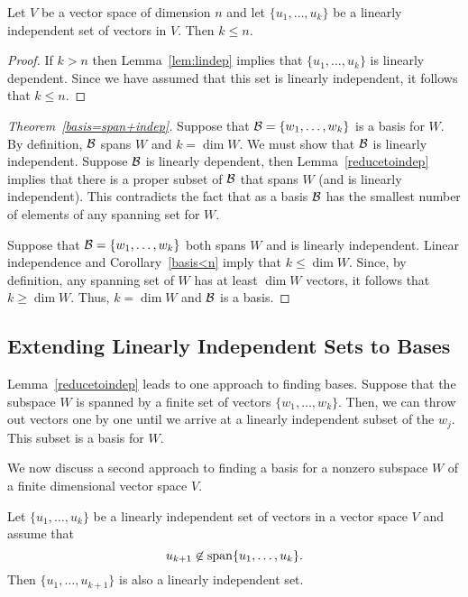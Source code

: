 \documentclass{ximera}
\begin{document}
\begin{corollary}  \label{basis<n}
Let $V$ be a vector space of dimension $n$ and let $\{u_1,\ldots,u_k\}$ be a 
linearly independent set of vectors in $V$.  Then $k\le n$.
\end{corollary} 

\begin{proof} If $k>n$ then Lemma~\ref{lem:lindep} implies that
$\{u_1,\ldots,u_k\}$ is linearly dependent.  Since we have
assumed that this set is linearly independent, it follows that
$k\leq n$. \end{proof}

\vspace{0.1in}

\begin{proof}[Theorem~\ref{basis=span+indep}]
Suppose that ${\cal B}=\{w_1,\ldots,w_k\}$ is a basis for $W$.
By definition, ${\cal B}$ spans $W$ and $k=\dim W$.  We must
show that ${\cal B}$ is linearly independent.  Suppose ${\cal B}$
is linearly dependent, then Lemma~\ref{reducetoindep} implies
that there is a proper subset of ${\cal B}$ that spans $W$ (and
is linearly independent). This contradicts the fact that as a
basis ${\cal B}$ has the smallest number of elements of any
spanning set for $W$.

Suppose that ${\cal B}=\{w_1,\ldots,w_k\}$ both spans $W$ and is
linearly independent.  Linear independence and Corollary~\ref{basis<n}
imply that $k\leq\dim W$.  Since, by definition, any spanning set
of $W$ has at least $\dim W$ vectors, it follows that $k\geq\dim W$.
Thus, $k = \dim W$ and  ${\cal B}$ is a basis.   \end{proof}

\subsection*{Extending Linearly Independent Sets to Bases} 

Lemma~\ref{reducetoindep} leads to one approach to finding
bases.  Suppose that the subspace $W$ is spanned by a finite
set of vectors $\{w_1,\ldots,w_k\}$.  Then, we can throw out
vectors one by one until we arrive at a linearly independent
subset of the $w_j$.  This subset is a basis for $W$.

We now discuss a second approach to finding a basis for a
nonzero subspace $W$ of a finite dimensional vector space $V$.

\begin{lemma}  \label{extendindep}
Let $\{u_1,\ldots,u_k\}$ be a linearly independent set of
vectors in a vector space $V$ and assume that
\[
u_{k+1}\not\in{\rm span}\{u_1,\ldots,u_k\}.
\]
Then $\{u_1,\ldots,u_{k+1}\}$ is also a linearly independent
set.
\end{lemma} 
\end{document}
